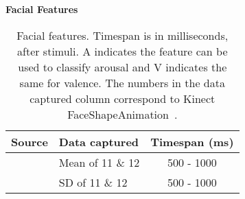 \begin{table}[H]
    \centering
    {\large \textbf{Facial Features}}\vspace{2pt}
    \begin{tabularx}{\columnwidth}{cXc}
        \toprule
        \textbf{Source} & \textbf{Data captured} & \textbf{Timespan (ms)} \\
        \midrule
        \cite{scherer_kinect} & Mean of 11 \& 12 & 500 - 1000 \\
        \cite{scherer_kinect} & SD of 11 \& 12 & 500 - 1000 \\
        \bottomrule
    \end{tabularx}
    \caption{Facial features. Timespan is in milliseconds, after stimuli. A indicates the feature can be used to classify arousal and V indicates the same for valence. The numbers in the data captured column correspond to Kinect FaceShapeAnimation~\protect\cite{faceshapes}.}
    \label{[TABLE] features face}
\end{table}



